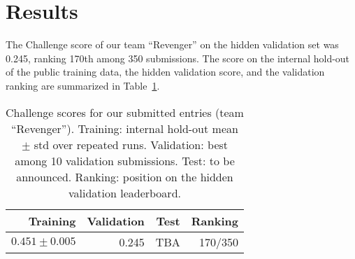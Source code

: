 \section{Results}
\label{sec:results}


The Challenge score of our team ``Revenger'' on the hidden validation set was 0.245, ranking 170th among 350 submissions. The score on the internal hold-out of the public training data, the hidden validation score, and the validation ranking are summarized in Table~\ref{tab:scores}.

\begin{table}[!htp]
\centering
\begin{tabular}{r|r|r|r}
Training & Validation & Test & Ranking \\\hline
$0.451 \pm 0.005$ & 0.245 & TBA & 170/350 \\\hline
\end{tabular}
\caption{Challenge scores for our submitted entries (team ``Revenger''). Training: internal hold-out mean $\pm$ std over repeated runs. Validation: best among 10 validation submissions. Test: to be announced. Ranking: position on the hidden validation leaderboard.}
\label{tab:scores}
\end{table}
